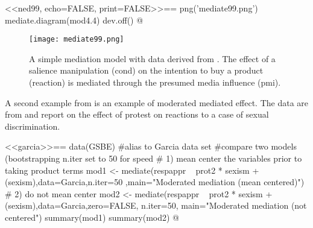 \documentclass[11pt]{article}
\begin{document}
<<ned99,  echo=FALSE, print=FALSE>>==
png('mediate99.png')
mediate.diagram(mod4.4)
dev.off()
@


\begin{figure}[htbp]
\begin{center}
\texttt{[image: mediate99.png]}
\caption{A simple mediation model \citep[p 99] {hayes:13} with data derived from \cite{talor:10}. The effect of a salience manipulation (cond) on the intention to buy a product (reaction) is mediated through the presumed media influence (pmi).}
\label{default}
\end{center}
\end{figure}

A second example from \citep{hayes:13} is an example of moderated mediated effect.  The data are from \citep{garcia:10} and report on the effect of protest on reactions to a case of sexual discrimination.  

<<garcia>>==
data(GSBE)  #alias to Garcia data set
#compare two models  (bootstrapping n.iter set to 50 for speed
# 1) mean center the variables prior to taking product terms
mod1 <- mediate(respappr ~ prot2 * sexism +(sexism),data=Garcia,n.iter=50
 ,main="Moderated mediation (mean centered)")
# 2) do not mean center
mod2 <- mediate(respappr ~ prot2 * sexism +(sexism),data=Garcia,zero=FALSE, n.iter=50,   
    main="Moderated  mediation (not centered")
summary(mod1)
summary(mod2)
@
\end{document}
